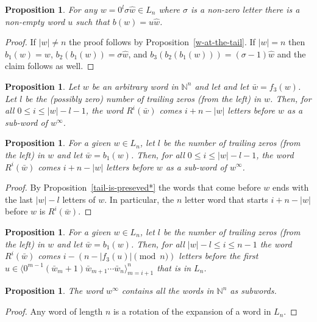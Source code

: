 \documentclass{article}
\newtheorem{proposition}[theorem]{Proposition}
\theoremstyle{definition}
\newcommand{\N}{{\mathbb{N}}}
\newcommand{\T}[1]{\langle{#1}\rangle}
\newcommand{\rr}[2]{R^{#2}({#1})}
\begin{document}
\begin{proposition}
	\label{hat-w-at-the-tail}
	For any $w=0^l \sigma \hat{w}\in L_n$ where $\sigma$ is a non-zero letter there is a non-empty word $u$ such that $b(w)=u\hat{w}$.
\end{proposition}
\begin{proof}
	If $|w|\neq n$ the proof follows by Proposition~\ref{w-at-the-tail}. If $|w|=n$ then $b_1(w)=w$, $b_2(b_1(w))=\sigma\hat{w}$, and $b_3(b_2(b_1(w)))=(\sigma-1)\hat{w}$ and the claim follows as well.
\end{proof}
	
	
\begin{proposition}\label{simple-pos}
	Let $w$ be an arbitrary word in $\N^n$ and let and let $\bar{w}=f_3(w)$. Let $l$ be the (possibly zero) number of trailing zeros (from the left) in $w$.  Then, for all $0 \leq i \leq |w|-l-1$, the word $\rr{\bar{w}}{i}$ comes $i+n-|w|$ letters before $w$ as a sub-word of $w^\infty$.
\end{proposition}



\begin{proposition}\label{simple-pos}
	For a given $w \in L_n$, let $l$ be the number of trailing zeros (from the left) in $w$ and let $\bar{w}=b_1(w)$. Then, for all $0 \leq i \leq |w|-l-1$, the word $\rr{\bar{w}}{i}$ comes $i+n-|w|$ letters before $w$ as a sub-word of $w^\infty$.
\end{proposition}
\begin{proof}
	By Proposition~\ref{tail-is-preseved*} the words that come before $w$ ends with the last $|w|-l$ letters of $w$. In particular, the $n$ letter word that starts $i+n-|w|$ before $w$ is $\rr{\bar{w}}{i}$.
\end{proof}

\begin{proposition}\label{advanced-pos}
	For a given $w \in L_n$, let $l$ be the number of trailing zeros (from the left) in $w$ and let $\bar{w}=b_1(w)$. Then, for all $|w|-l \leq i \leq n-1$ the word $\rr{\bar{w}}{i}$ comes $i-(n-|f_3(u)| \pmod n)$ letters before the first $u \in \T{0^{m-1} (\bar{w}_{m} + 1) \bar{w}_{m+1}\cdots \bar{w}_n}_{m=i+1}^{n}$ that is in $L_n$. 
\end{proposition}


\begin{proposition}
	The word $w^\infty$ contains all the words in $\N^n$ as subwords.
\end{proposition}
\begin{proof}
	Any word of length $n$ is a rotation of the expansion of a word in $L_n$.
\end{proof}
\end{document}
